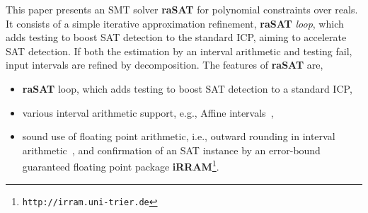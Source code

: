 \documentclass[runningheads,a4paper,oribibl]{llncs}
\begin{document}
This paper presents an SMT solver {\bf raSAT} for polynomial constraints over reals. 
It consists of a simple iterative approximation refinement, {\bf raSAT} {\em loop}, 
which adds testing to boost SAT detection to the standard ICP, 
aiming to accelerate SAT detection. 
If both the estimation by an interval arithmetic and testing fail, input intervals are refined by decomposition. 
%
The features of {\bf raSAT} are, 
\begin{itemize}
\item {\bf raSAT} loop, which adds testing to boost SAT detection to a standard ICP, 
\item various interval arithmetic support, e.g., 
Affine intervals~\cite{Messine_extensionsof,Ngoc:2009:ORE:1685167.1685421,VanKhanh201227}, 
\item sound use of floating point arithmetic, i.e., 
outward rounding in interval arithmetic~\cite{Hickey:2001:IAP:502102.502106}, 
and confirmation of an SAT instance by an error-bound guaranteed floating point package {\bf iRRAM}\footnote{%
\tt http://irram.uni-trier.de}. 
\end{itemize}
\end{document}
